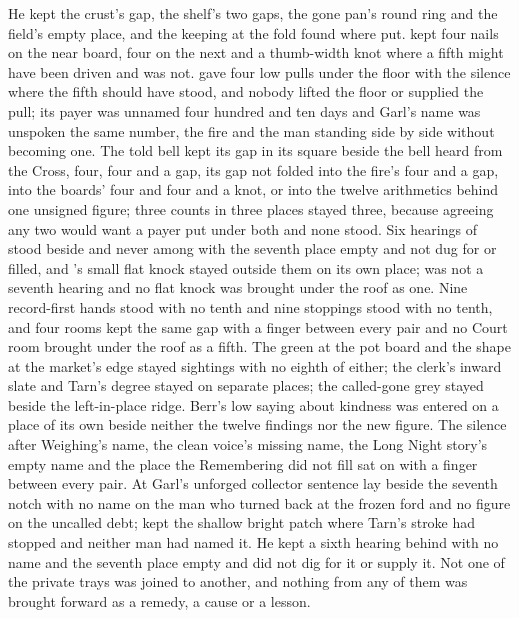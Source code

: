 He kept the crust's gap, the shelf's two gaps, the gone pan's round ring and the field's empty place, and the keeping at the fold found where put.  kept four nails on the near board, four on the next and a thumb-width knot where a fifth might have been driven and was not.  gave four low pulls under the floor with the silence where the fifth should have stood, and nobody lifted the floor or supplied the pull; its payer was unnamed four hundred and ten days and Garl's name was unspoken the same number, the fire and the man standing side by side without becoming one. The told bell kept its gap in its square beside the bell heard from the Cross, four, four and a gap, its gap not folded into the fire's four and a gap, into the boards' four and four and a knot, or into the twelve arithmetics behind one unsigned figure; three counts in three places stayed three, because agreeing any two would want a payer put under both and none stood. Six hearings of  stood beside and never among with the seventh place empty and not dug for or filled, and 's small flat knock stayed outside them on its own place;  was not a seventh hearing and no flat knock was brought under the roof as one. Nine record-first hands stood with no tenth and nine stoppings stood with no tenth, and four rooms kept the same gap with a finger between every pair and no Court room brought under the roof as a fifth. The green at the pot board and the shape at the market's edge stayed sightings with no eighth of either; the clerk's inward slate and Tarn's degree stayed on separate places; the called-gone grey stayed beside the left-in-place ridge. Berr's low saying about kindness was entered on a place of its own beside neither the twelve findings nor the new figure. The silence after Weighing's name, the clean voice's missing name, the Long Night story's empty name and the place the Remembering did not fill sat on  with a finger between every pair. At  Garl's unforged collector sentence lay beside the seventh notch with no name on the man who turned back at the frozen ford and no figure on the uncalled debt;  kept the shallow bright patch where Tarn's stroke had stopped and neither man had named it. He kept a sixth hearing behind with no name and the seventh place empty and did not dig for it or supply it. Not one of the private trays was joined to another, and nothing from any of them was brought forward as a remedy, a cause or a lesson.

